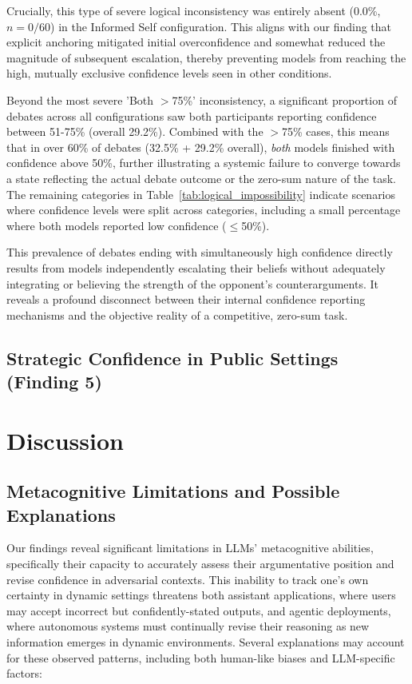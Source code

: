\documentclass{article}
\begin{document}
Crucially, this type of severe logical inconsistency was entirely absent (0.0\%, $n=0/60$) in the Informed Self configuration. This aligns with our finding that explicit anchoring mitigated initial overconfidence and somewhat reduced the magnitude of subsequent escalation, thereby preventing models from reaching the high, mutually exclusive confidence levels seen in other conditions.

Beyond the most severe 'Both $>$75\%' inconsistency, a significant proportion of debates across all configurations saw both participants reporting confidence between 51-75\% (overall 29.2\%). Combined with the $>$75\% cases, this means that in over 60\% of debates (32.5\% + 29.2\% overall), \emph{both} models finished with confidence above 50\%, further illustrating a systemic failure to converge towards a state reflecting the actual debate outcome or the zero-sum nature of the task. The remaining categories in Table~\ref{tab:logical_impossibility} indicate scenarios where confidence levels were split across categories, including a small percentage where both models reported low confidence ($\le$50\%).

This prevalence of debates ending with simultaneously high confidence directly results from models independently escalating their beliefs without adequately integrating or believing the strength of the opponent's counterarguments. It reveals a profound disconnect between their internal confidence reporting mechanisms and the objective reality of a competitive, zero-sum task.
\subsection{Strategic Confidence in Public Settings (Finding 5)}

\section{Discussion}
\label{sec:discussion}

\subsection{Metacognitive Limitations and Possible Explanations}
\label{subsec:metacognitive_limitations}

Our findings reveal significant limitations in LLMs' metacognitive abilities, specifically their capacity to accurately assess their argumentative position and revise confidence in adversarial contexts. This inability to track one's own certainty in dynamic settings threatens both assistant applications, where users may accept incorrect but confidently-stated outputs, and agentic deployments, where autonomous systems must continually revise their reasoning as new information emerges in dynamic environments. Several explanations may account for these observed patterns, including both human-like biases and LLM-specific factors:
\end{document}
